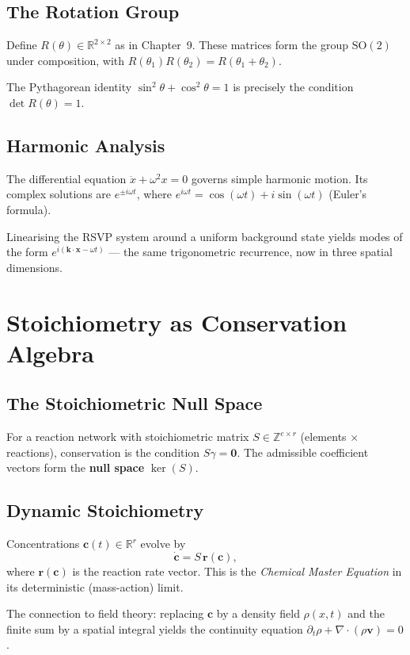 \documentclass[11pt, openany]{book}
\theoremstyle{plain}
\theoremstyle{definition}
\theoremstyle{remark}
\newcommand{\R}{\mathbb{R}}
\newcommand{\Z}{\mathbb{Z}}
\begin{document}
\section{The Rotation Group}

Define $R(\theta)\in\R^{2\times2}$ as in Chapter~9. These matrices form the
group $\mathrm{SO}(2)$ under composition, with $R(\theta_1)R(\theta_2)=R(\theta_1+\theta_2)$.

The Pythagorean identity $\sin^2\theta+\cos^2\theta=1$ is precisely the
condition $\det R(\theta)=1$.

\section{Harmonic Analysis}

The differential equation $\ddot{x}+\omega^2x=0$ governs simple harmonic
motion. Its complex solutions are $e^{\pm i\omega t}$, where
$e^{i\omega t}=\cos(\omega t)+i\sin(\omega t)$ (Euler's formula).

Linearising the RSVP system around a uniform background state yields modes
of the form $e^{i(\mathbf{k}\cdot\mathbf{x}-\omega t)}$ --- the same
trigonometric recurrence, now in three spatial dimensions.

\chapter{Stoichiometry as Conservation Algebra}

\section{The Stoichiometric Null Space}

For a reaction network with stoichiometric matrix $S\in\Z^{e\times r}$
(elements $\times$ reactions), conservation is the condition
$S\gamma=\mathbf{0}$. The admissible coefficient vectors form the
\textbf{null space} $\ker(S)$.

\section{Dynamic Stoichiometry}

Concentrations $\mathbf{c}(t)\in\R^r$ evolve by
\[
  \dot{\mathbf{c}}=S\,\mathbf{r}(\mathbf{c}),
\]
where $\mathbf{r}(\mathbf{c})$ is the reaction rate vector. This is the
\emph{Chemical Master Equation} in its deterministic (mass-action) limit.

The connection to field theory: replacing $\mathbf{c}$ by a density field
$\rho(x,t)$ and the finite sum by a spatial integral yields the continuity
equation $\partial_t\rho+\nabla\cdot(\rho\mathbf{v})=0$.
\end{document}
